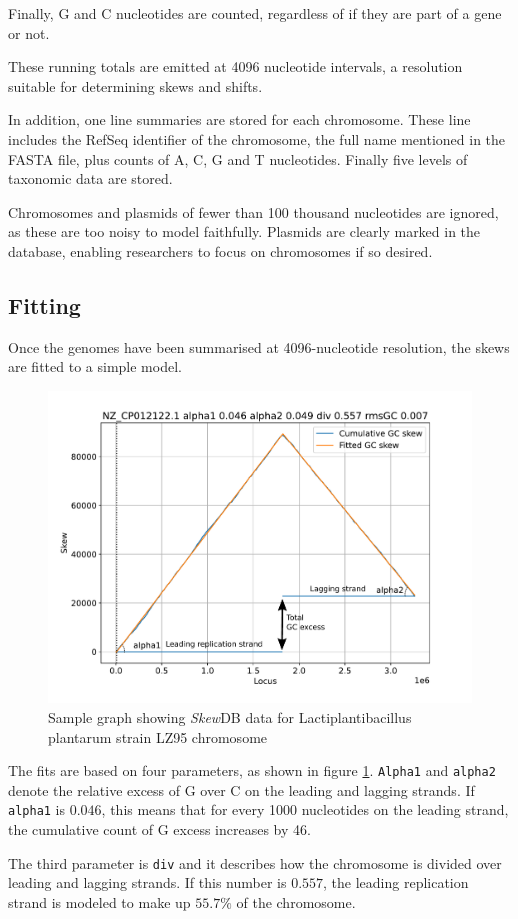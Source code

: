 \documentclass[fleqn,10pt]{wlscirep}
\begin{document}
Finally, G and C nucleotides are counted, regardless of if they are part of a gene or not.

These running totals are emitted at 4096 nucleotide intervals, a resolution suitable for determining skews and shifts.

In addition, one line summaries are stored for each chromosome. These line includes the RefSeq identifier of the chromosome, the full name mentioned in the FASTA file, plus counts of A, C, G and T nucleotides. Finally five levels of taxonomic data are stored.

Chromosomes and plasmids of fewer than 100 thousand nucleotides are ignored, as these are too noisy to model faithfully. Plasmids are clearly marked in the database, enabling researchers to focus on chromosomes if so desired.

\subsection*{Fitting}
Once the genomes have been summarised at 4096-nucleotide resolution, the skews are fitted to a simple model.

\begin{figure}[ht]
\centering
\includegraphics[width=0.5\linewidth]{explainer.pdf}
\caption{Sample graph showing \emph{Skew}DB data for Lactiplantibacillus plantarum strain LZ95 chromosome}
\label{fig:explainer-graph}
\end{figure}

The fits are based on four parameters, as shown in figure \ref{fig:explainer-graph}. {\tt Alpha1} and {\tt alpha2} denote the relative excess of G over C on the leading and lagging strands. If {\tt alpha1} is $0.046$, this means that for every 1000 nucleotides on the leading strand, the cumulative count of G excess increases by 46.

The third parameter is {\tt div} and it describes how the chromosome is divided over leading and lagging strands. If this number is $0.557$, the leading replication strand is modeled to make up $55.7\%$ of the chromosome.
\end{document}
